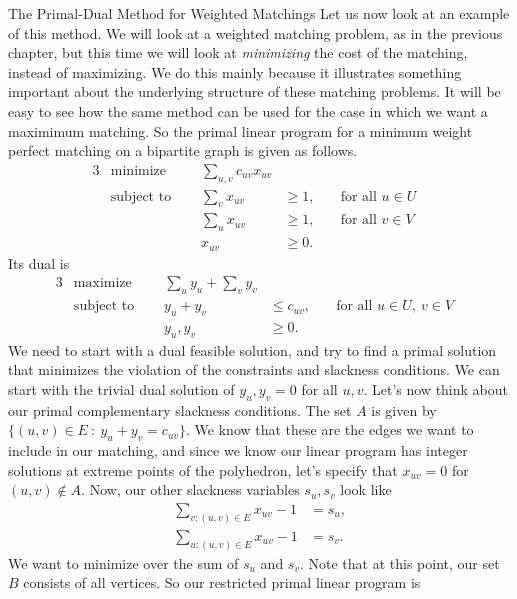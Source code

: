 \begin{section}{The Primal-Dual Method for Weighted Matchings}
	Let us now look at an example of this method. We will look at a weighted matching problem, as 
	in the previous chapter, but this time we will look at \emph{minimizing} the cost of the 
	matching, instead of maximizing. We do this mainly because it illustrates something important 
	about the underlying structure of these matching problems. It will be easy to see how the 
	same method can be used for the case in which we want a maximimum matching. So the primal 
	linear program for a minimum weight perfect matching on a bipartite graph is given as follows. 
	\begin{alignat}{3}
		& \text{minimize } & \sum_{u,v} c_{uv} x_{uv}& \\
		& \text{subject to } \quad & \sum_{v} x_{uv} & \geq 1, & \quad \text{for all } u\in U& \\
				     &\quad & \sum_{u} x_{uv} & \geq 1, & \quad \text{for all } v\in 
				     V & \\
				&& x_{uv} & \geq 0.
	\end{alignat}
	Its dual is
	\begin{alignat}{3}
		& \text{maximize } & \sum_{u}y_u + \sum_{v}y_v & \\
		& \text{subject to } \quad & y_u + y_v & \leq c_{uv}, & \quad \text{for all }
					u\in U,\ v\in V & \\
				    && y_u,y_v & \geq 0.
	\end{alignat}
	We need to start with a dual feasible solution, and try to find a primal solution that 
	minimizes the violation of the constraints and slackness conditions. We can start with the 
	trivial dual solution of $y_u,y_v = 0$ for all $u,v$. Let's now think about our primal 
	complementary slackness conditions. 
	The set $A$ is given by $\{(u,v)\in E\ :\ y_u + y_v = c_{uv}\}$. 
	We know that these are the edges we want to include in our matching, and since we know our 
	linear program has integer solutions at extreme points of the polyhedron, let's specify that 
	$x_{uv} = 0$ for $(u,v)\notin A$. Now, our other slackness variables $s_u,s_v$ look like 
	\begin{align*}
		\sum_{v:(u,v)\in E} x_{uv} - 1 &= s_u, \\
		\sum_{u:(u,v)\in E} x_{uv} - 1 &= s_v.
	\end{align*}
	We want to minimize over the sum of $s_u$ and $s_v$. Note that at this point, our set $B$ 
	consists of all vertices. So our restricted primal linear program is

\end{section}
